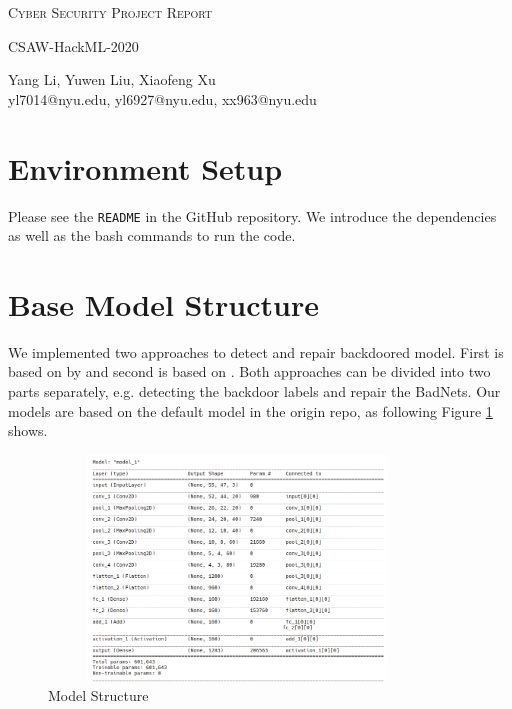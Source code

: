 \documentclass[letterpaper]{article}
\makeatletter
\newcommand{\soptitle}{Cyber Security Project Report}
\newcommand{\subtitle}{CSAW-HackML-2020}
\newcommand{\yourname}{Yang Li, Yuwen Liu, Xiaofeng Xu}
\newcommand{\youremail}{yl7014@nyu.edu, yl6927@nyu.edu, xx963@nyu.edu}
\newcommand{\amper}{{\fontspec[Scale=.95]{Adobe Caslon Pro}\selectfont\itshape\&~{}}}
\makeatother
\begin{document}
\begin{center}{\huge \scshape \soptitle}\end{center}
\begin{center}{\large \subtitle}\end{center}
\begin{center}\vspace{0.2em} {\Large \yourname\\}
  {\youremail}\end{center}

\section*{Environment Setup}
Please see the \texttt{README} in the GitHub repository\footnotemark{}. We introduce the dependencies as well as the bash commands to run the code.

\section*{Base Model Structure}
We implemented two approaches to detect and repair backdoored model. First is based on by \cite{wang2019neural} and second is based on \cite{gao2019strip}. Both approaches can be divided into two parts separately, e.g. detecting the backdoor labels and repair the BadNets. Our models are based on the default model in the origin repo, as following Figure \ref{fig:base_structure} shows. 
\begin{figure}[H]
    \centering
    \includegraphics[width=10cm,  height=6cm]{img/model_structure.png}
    \caption{Model Structure}
    \label{fig:base_structure}
\end{figure}
\end{document}
